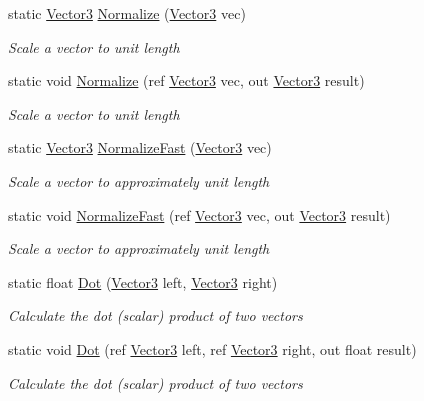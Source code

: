 \begin{DoxyCompactItemize}
static \hyperlink{struct_open_t_k_1_1_vector3}{Vector3} \hyperlink{struct_open_t_k_1_1_vector3_a2d36ae21b1e4e7a1fdf9fe02252e2888}{Normalize} (\hyperlink{struct_open_t_k_1_1_vector3}{Vector3} vec)
\begin{DoxyCompactList}\small\item\em Scale a vector to unit length \end{DoxyCompactList}\item 
static void \hyperlink{struct_open_t_k_1_1_vector3_abf4c819096b017f4aff906e4857f40a0}{Normalize} (ref \hyperlink{struct_open_t_k_1_1_vector3}{Vector3} vec, out \hyperlink{struct_open_t_k_1_1_vector3}{Vector3} result)
\begin{DoxyCompactList}\small\item\em Scale a vector to unit length \end{DoxyCompactList}\item 
static \hyperlink{struct_open_t_k_1_1_vector3}{Vector3} \hyperlink{struct_open_t_k_1_1_vector3_a15037989f67a2055c926f261ef22fc88}{Normalize\-Fast} (\hyperlink{struct_open_t_k_1_1_vector3}{Vector3} vec)
\begin{DoxyCompactList}\small\item\em Scale a vector to approximately unit length \end{DoxyCompactList}\item 
static void \hyperlink{struct_open_t_k_1_1_vector3_a7855c38823558611bf1b47105b749370}{Normalize\-Fast} (ref \hyperlink{struct_open_t_k_1_1_vector3}{Vector3} vec, out \hyperlink{struct_open_t_k_1_1_vector3}{Vector3} result)
\begin{DoxyCompactList}\small\item\em Scale a vector to approximately unit length \end{DoxyCompactList}\item 
static float \hyperlink{struct_open_t_k_1_1_vector3_ad526184d8897315b3c8fef587af54d07}{Dot} (\hyperlink{struct_open_t_k_1_1_vector3}{Vector3} left, \hyperlink{struct_open_t_k_1_1_vector3}{Vector3} right)
\begin{DoxyCompactList}\small\item\em Calculate the dot (scalar) product of two vectors \end{DoxyCompactList}\item 
static void \hyperlink{struct_open_t_k_1_1_vector3_adb5d3b3b1958832df07ef781fa187221}{Dot} (ref \hyperlink{struct_open_t_k_1_1_vector3}{Vector3} left, ref \hyperlink{struct_open_t_k_1_1_vector3}{Vector3} right, out float result)
\begin{DoxyCompactList}\small\item\em Calculate the dot (scalar) product of two vectors \end{DoxyCompactList}\item 

\end{DoxyCompactItemize}

